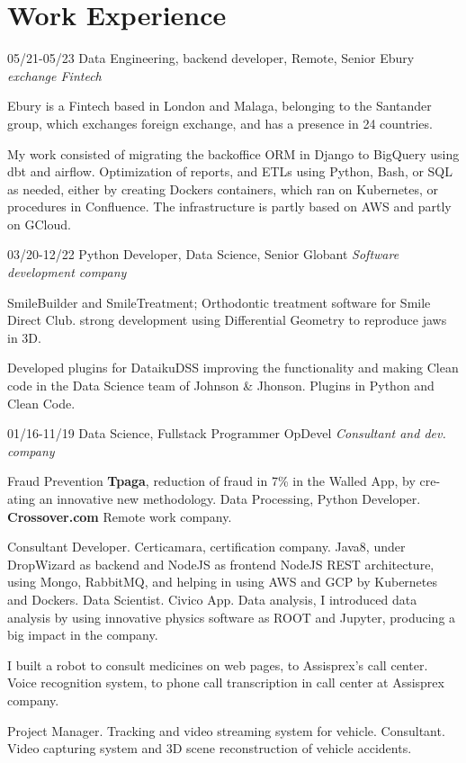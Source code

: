 \section{Work Experience}


\begin{entrylist}
  \entry
    {05/21-05/23}       
    {Data Engineering, backend developer, Remote, Senior}
    {Ebury {\sl exchange Fintech}}
    {Ebury is a Fintech based in London and Malaga, belonging to the Santander group, which exchanges
foreign exchange, and has a presence in 24 countries.

My work consisted of migrating the backoffice ORM in Django to BigQuery using dbt and airflow. Optimization of reports, and ETLs
using Python, Bash, or SQL as needed, either by creating Dockers containers, which ran on Kubernetes, or procedures in Confluence.
The infrastructure is partly based on AWS and partly on GCloud.}
  \entry
    {03/20-12/22}
    {Python Developer, Data Science, Senior}
    {Globant {\sl Software development company}}
    {SmileBuilder and SmileTreatment; Orthodontic treatment software for Smile Direct Club. strong development using Differential Geometry to reproduce jaws in 3D.

Developed plugins for DataikuDSS improving the functionality and making
Clean code in the Data Science team of Johnson \& Jhonson. Plugins in Python and Clean Code.}

  \entry
    {01/16-11/19}
    {Data Science, Fullstack Programmer}
    {OpDevel {\sl Consultant and dev. company}}
    {Fraud Prevention \textbf{Tpaga}, reduction of fraud in 7\% in the Walled App, by cre-
ating an innovative new methodology. Data Processing, Python Developer. \textbf{Crossover.com} Remote work company.

Consultant Developer. Certicamara, certification company. Java8, under
DropWizard as backend and NodeJS as frontend NodeJS REST architecture,
using Mongo, RabbitMQ, and helping in using AWS and GCP by Kubernetes
and Dockers. Data Scientist. Civico App. Data analysis, I introduced data analysis by using
innovative physics software as ROOT and Jupyter, producing a big impact in
the company.

I built a robot to consult medicines on web pages, to Assisprex’s call center.
Voice recognition system, to phone call transcription in call center at Assisprex company.

Project Manager. Tracking and video streaming system for vehicle.
Consultant. Video capturing system and 3D scene reconstruction of vehicle
accidents.

}
\end{entrylist}
